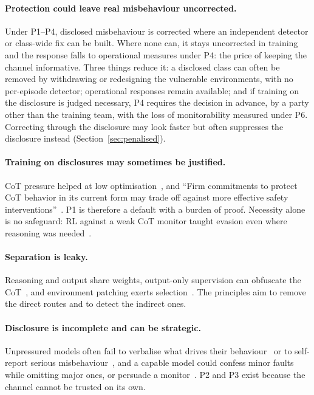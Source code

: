 \documentclass[11pt]{article}
\begin{document}
\paragraph{Protection could leave real misbehaviour uncorrected.} Under P1--P4, disclosed misbehaviour is corrected where an independent detector or class-wide fix can be built. Where none can, it stays uncorrected in training and the response falls to operational measures under P4: the price of keeping the channel informative. Three things reduce it: a disclosed class can often be removed by withdrawing or redesigning the vulnerable environments, with no per-episode detector; operational responses remain available; and if training on the disclosure is judged necessary, P4 requires the decision in advance, by a party other than the training team, with the loss of monitorability measured under P6. Correcting through the disclosure may look faster but often suppresses the disclosure instead (Section~\ref{sec:penalised}).

\paragraph{Training on disclosures may sometimes be justified.} CoT pressure helped at low optimisation~\cite{baker2025}, and ``Firm commitments to protect CoT behavior in its current form may trade off against more effective safety interventions''~\cite[Sec.~5]{korbak2025}. P1 is therefore a default with a burden of proof. Necessity alone is no safeguard: RL against a weak CoT monitor taught evasion even where reasoning was needed~\cite[Sec.~7]{emmons2025}.

\paragraph{Separation is leaky.} Reasoning and output share weights, output-only supervision can obfuscate the CoT~\cite{drori2025,mitranihadida2026}, and environment patching exerts selection~\cite{baker2025}. The principles aim to remove the direct routes and to detect the indirect ones.

\paragraph{Disclosure is incomplete and can be strategic.} Unpressured models often fail to verbalise what drives their behaviour~\cite{chen2025} or to self-report serious misbehaviour~\cite{golchin2026}, and a capable model could confess minor faults while omitting major ones, or persuade a monitor~\cite{wagner2025}. P2 and P3 exist because the channel cannot be trusted on its own.
\end{document}
